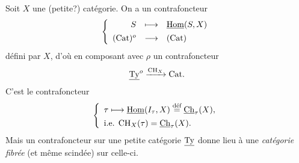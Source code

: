 Soit $X$ une (petite?) catégorie. On a un contrafoncteur
\[
\left\{
\begin{array}{rcl}
S & \longmapsto & \underline{\mathrm{Hom}}(S,X)\\[1ex]
(\mathrm{Cat})^o & \longrightarrow & (\mathrm{Cat})
\end{array}
\right.
\]
défini par $X$, d'où en composant avec $\rho$ un contrafoncteur
\[
\underline{\mathrm{Ty}}^{o} \xrightarrow{\mathrm{CH}_X} \mathrm{Cat}.
\]
C'est le contrafoncteur
\[
\left\{
\begin{array}{l}
\tau \longmapsto \underline{\mathrm{Hom}}(I_\tau,X) \overset{\text{déf}}{=} \underline{\mathrm{Ch}}_\tau(X),\\[1ex]
\text{i.e. } \mathrm{CH}_X(\tau)=\underline{\mathrm{Ch}}_\tau(X).
\end{array}
\right.
\]
Mais un contrafoncteur sur une petite catégorie $\underline{\mathrm{Ty}}$ donne lieu à une \textit{catégorie fibrée} (et même scindée) sur celle-ci.

